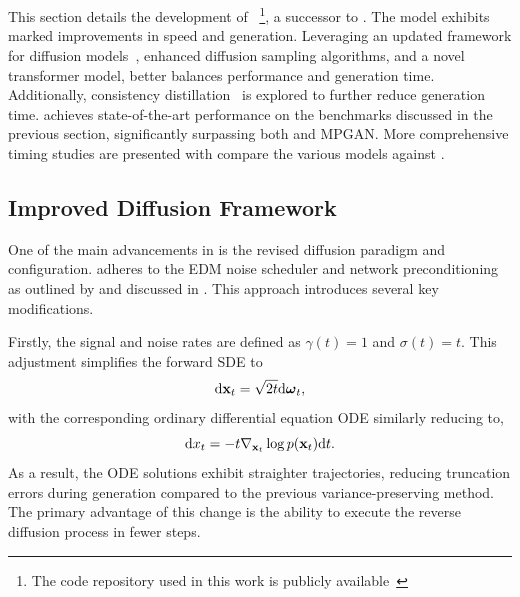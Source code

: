 \section{\pcdroid}

This section details the development of \pcdroid~\cite{PCDroid}\footnote{The code repository used in this work is publicly available~\cite{PCDroidCode}}, a successor to \pcjedi.
The \pcdroid model exhibits marked improvements in speed and generation.
Leveraging an updated framework for diffusion models~\cite{ElucidatingDesignSpace}, enhanced diffusion sampling algorithms, and a novel transformer model, \pcdroid better balances performance and generation time.
Additionally, consistency distillation~\cite{ConsistencyModels} is explored to further reduce generation time.
\pcdroid achieves state-of-the-art performance on the benchmarks discussed in the previous section, significantly surpassing both \pcjedi and MPGAN.
More comprehensive timing studies are presented with compare the various models against \pythia.

\subsection{Improved Diffusion Framework}

One of the main advancements in \pcdroid is the revised diffusion paradigm and configuration.
\pcdroid adheres to the EDM noise scheduler and network preconditioning as outlined by \textcite{ElucidatingDesignSpace} and discussed in .
This approach introduces several key modifications.

Firstly, the signal and noise rates are defined as $\gamma(t)=1$ and $\sigma(t)=t$.
This adjustment simplifies the forward SDE to
\begin{equation}
    \mathrm{d} \mathbf{x}_t = \sqrt{2t} \mathrm{d} \boldsymbol{\omega}_t,
\end{equation}
with the corresponding ordinary differential equation ODE similarly reducing to,
\begin{equation}
    \mathrm{d} x_t = - t \nabla_{\mathbf{x}_t} \log p(\mathbf{x}_t) \mathrm{d} t.
\end{equation}
As a result, the ODE solutions exhibit straighter trajectories, reducing truncation errors during generation compared to the previous variance-preserving method.
The primary advantage of this change is the ability to execute the reverse diffusion process in fewer steps.

